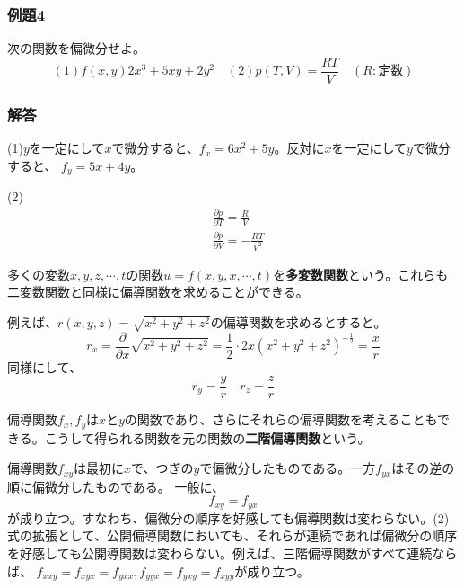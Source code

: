 \documentclass[a4j,dvipdfmx]{jsarticle}
\begin{document}
\subsubsection*{例題4}
次の関数を偏微分せよ。
\begin{equation*}
    (1)f(x,y)2x^3+5xy+2y^2\quad(2)p(T,V)=\frac{RT}{V}\quad(R:\text{定数})
\end{equation*}
\subsubsection*{解答}
(1)$y$を一定にして$x$で微分すると、$f_x=6x^2+5y$。反対に$x$を一定にして$y$で微分すると、
$f_y=5x+4y$。

(2)\begin{align*}
    &\frac{\partial p}{\partial T}=\frac{R}{V}\\
    &\frac{\partial p}{\partial V}=-\frac{RT}{V^2}
\end{align*}

多くの変数$x,y,z,\cdots ,t$の関数$u=f(x,y,x,\cdots,t)$を\textbf{多変数関数}という。これらも二変数関数と同様に偏導関数を求めることができる。

例えば、$\displaystyle r(x,y,z)=\sqrt{x^2+y^2+z^2}$の偏導関数を求めるとすると。
\begin{equation*}
    r_x=\frac{\partial}{\partial x}\sqrt{x^2+y^2+z^2}=\frac{1}{2}\cdot 2x(x^2+y^2+z^2)^{-\frac{1}{2}}=\frac{x}{r}
\end{equation*}
同様にして、
\begin{equation*}
    r_y=\frac{y}{r}\quad r_z=\frac{z}{r}
\end{equation*}

偏導関数$f_x,f_y$は$x$と$y$の関数であり、さらにそれらの偏導関数を考えることもできる。こうして得られる関数を元の関数の\textbf{二階偏導関数}という。

偏導関数$f_{xy}$は最初に$x$で、つぎの$y$で偏微分したものである。一方$f_{yx}$はその逆の順に偏微分したものである。
一般に、
\begin{equation}
    f_{xy}=f_{yx}
\end{equation}
が成り立つ。すなわち、偏微分の順序を好感しても偏導関数は変わらない。(2)式の拡張として、公開偏導関数においても、それらが連続であれば偏微分の順序を好感しても公開導関数は変わらない。例えば、三階偏導関数がすべて連続ならば、
$f_{xxy}=f_{xyx}=f_{yxx},f_{yyx}=f_{yxy}=f_{xyy}$が成り立つ。
\end{document}
